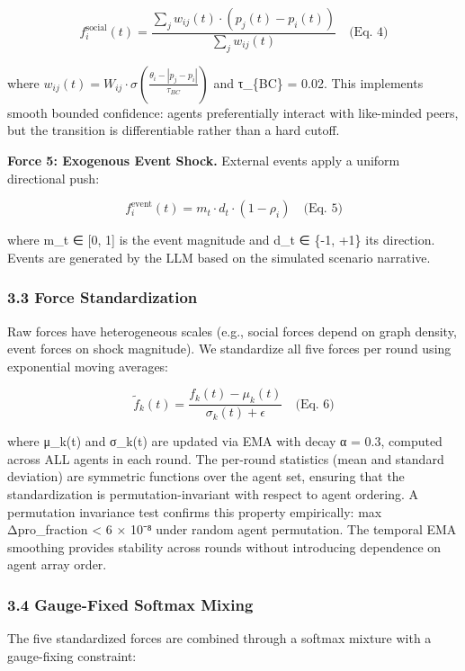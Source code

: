 \documentclass[
]{article}
\begin{document}
\[f_i^{\text{social}}(t) = \frac{\sum_j w_{ij}(t) \cdot (p_j(t) - p_i(t))}{\sum_j w_{ij}(t)} \quad \text{(Eq. 4)}\]

where
\(w_{ij}(t) = W_{ij} \cdot \sigma\left(\frac{\theta_i - |p_j - p_i|}{\tau_{BC}}\right)\)
and τ\_\{BC\} = 0.02. This implements smooth bounded confidence: agents
preferentially interact with like-minded peers, but the transition is
differentiable rather than a hard cutoff.

\textbf{Force 5: Exogenous Event Shock.} External events apply a uniform
directional push:

\[f_i^{\text{event}}(t) = m_t \cdot d_t \cdot (1 - \rho_i) \quad \text{(Eq. 5)}\]

where m\_t ∈ {[}0, 1{]} is the event magnitude and d\_t ∈ \{-1, +1\} its
direction. Events are generated by the LLM based on the simulated
scenario narrative.

\subsubsection{3.3 Force Standardization}\label{force-standardization}

Raw forces have heterogeneous scales (e.g., social forces depend on
graph density, event forces on shock magnitude). We standardize all five
forces per round using exponential moving averages:

\[\tilde{f}_k(t) = \frac{f_k(t) - \mu_k(t)}{\sigma_k(t) + \epsilon} \quad \text{(Eq. 6)}\]

where μ\_k(t) and σ\_k(t) are updated via EMA with decay α = 0.3,
computed across ALL agents in each round. The per-round statistics (mean
and standard deviation) are symmetric functions over the agent set,
ensuring that the standardization is permutation-invariant with respect
to agent ordering. A permutation invariance test confirms this property
empirically: max \textbar Δpro\_fraction\textbar{} \textless{} 6 × 10⁻⁸
under random agent permutation. The temporal EMA smoothing provides
stability across rounds without introducing dependence on agent array
order.

\subsubsection{3.4 Gauge-Fixed Softmax
Mixing}\label{gauge-fixed-softmax-mixing}

The five standardized forces are combined through a softmax mixture with
a gauge-fixing constraint:
\end{document}
